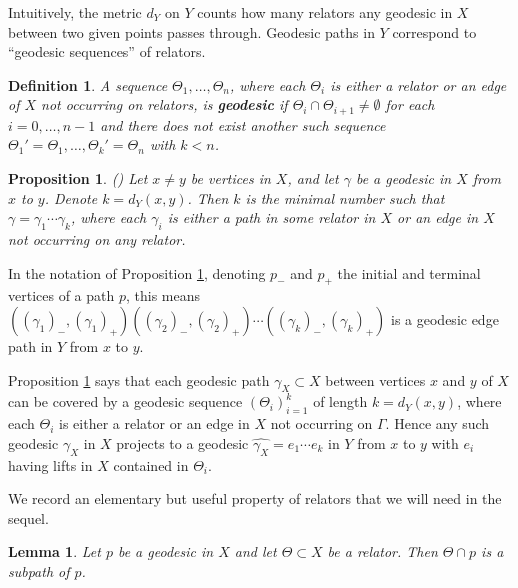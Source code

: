 \documentclass{article}[11pt]
\newtheorem{defn}[thm]{Definition}
\newtheorem{prop}[thm]{Proposition}
\newtheorem{lem}[thm]{Lemma}
\begin{document}
{Intuitively, the metric $d_Y$ on $Y$ counts how many relators any geodesic in $X$ between two given points passes through. Geodesic paths in $Y$ correspond to ``geodesic sequences'' of relators. 

\begin{defn}
    A sequence $\Theta_1,\ldots,\Theta_n$, where each $\Theta_i$ is either a relator or an edge of $X$ not occurring on relators, is \textbf{geodesic} if $\Theta_i \cap \Theta_{i+1} \neq \emptyset$ for each $i = 0,\ldots,n-1$ and there does not exist another such sequence $\Theta_1' = \Theta_1,\ldots, \Theta_k' = \Theta_n$ with $k < n$. 
\end{defn}

\begin{prop}(\cite[Proposition 3.6]{Gruber_Sisto})
    \label{Geod decomp}
    Let $x \neq y$ be vertices in $X$, and let $\gamma$ be a geodesic in $X$ from $x$ to $y$. Denote $k = d_Y(x,y)$. Then $k$ is the minimal number such that $\gamma = \gamma_{1} \cdots \gamma_{k}$, where each $\gamma_{i}$ is either a path in some relator in $X$ or an edge in $X$ not occurring on any relator. %
\end{prop}

In the notation of Proposition \ref{Geod decomp}, denoting $p_-$ and $p_+$ the initial and terminal vertices of a path $p$, this means $((\gamma_{1})_-, (\gamma_{1})_+)((\gamma_{2})_-, (\gamma_{2})_+) \cdots ((\gamma_{k})_-, (\gamma_{k})_+)$ is a geodesic edge path in $Y$ from $x$ to $y$. 

Proposition \ref{Geod decomp} says that each geodesic path $\gamma_X \subset X$ between vertices $x$ and $y$ of $X$ can be covered by a geodesic sequence $(\Theta_i)_{i=1}^k$ of length $k = d_Y(x,y)$, where each $\Theta_i$ is either a relator or an edge in $X$ not occurring on $\Gamma$. Hence any such geodesic $\gamma_X$ in $X$ projects to a geodesic $\hat{\gamma_X} = e_1 \cdots e_k$ in $Y$ from $x$ to $y$ with $e_i$ having lifts in $X$ contained in $ \Theta_i$.

We record an elementary but useful property of relators that we will need in the sequel.

\begin{lem}
    \label{geodesic subpath}
    Let $p$ be a geodesic in $X$ and let $\Theta \subset X$ be a relator. Then $\Theta \cap p$ is a subpath of $p$.
\end{lem}

}
\end{document}
